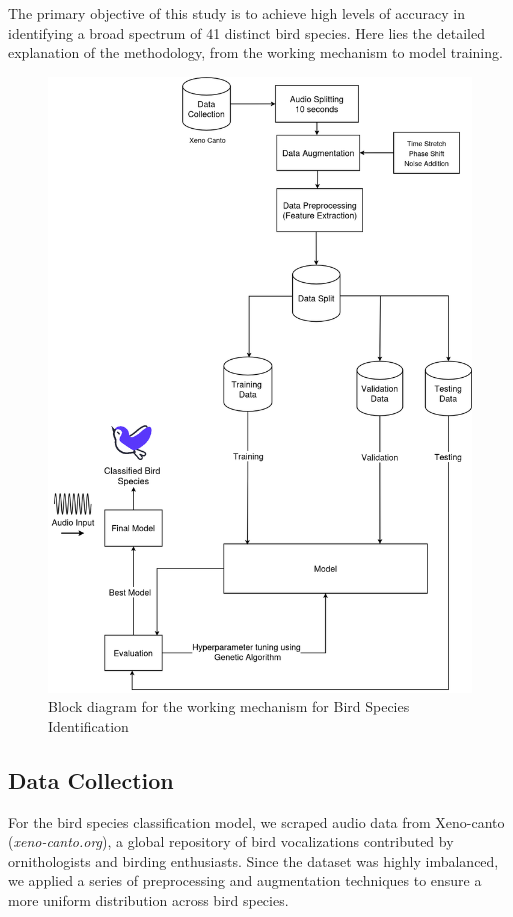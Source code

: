         The primary objective of this study is to achieve high levels of accuracy in
        identifying a broad spectrum of 41 distinct bird species. Here lies the
        detailed explanation of the methodology, from the working mechanism to model
        training.

        \begin{figure}[h!]
            \centering
            \includegraphics[scale=0.33]{images/MajorProject-Audio Methodology.png}
            \caption{Block diagram for the working mechanism for Bird Species Identification}%
        \end{figure}


        \subsection{Data Collection}
        For the bird species classification model, we scraped audio data from Xeno-canto
        (\textit{xeno-canto.org}), a global repository of bird vocalizations
        contributed by ornithologists and birding enthusiasts. Since the dataset was
        highly imbalanced, we applied a series of preprocessing and augmentation
        techniques to ensure a more uniform distribution across bird species.
        
